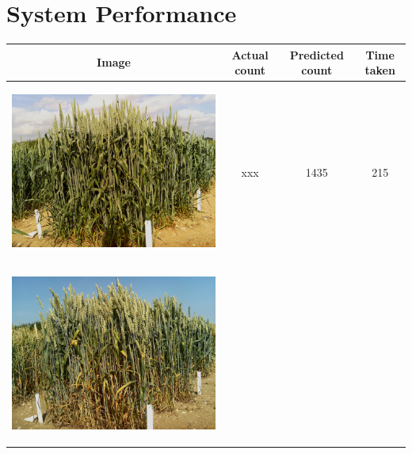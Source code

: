 \section{System Performance}
\begin{table}[hp!]
  \centering
  \begin{tabular}{ | c | c | c | c |}
    \hline
    Image & Actual count & Predicted count & Time taken \\ \hline
    \begin{minipage}{.3\textwidth}
      \begin{center}
		\includegraphics[width=\linewidth]{Images/001}
      \end{center}
    \end{minipage}
    &
      xxx
    & 
      1435
    & 
      215
    \\ \hline
    \begin{minipage}{.3\textwidth}
      \begin{center}
		\includegraphics[width=\linewidth]{Images/002}

\end{center}
\end{minipage}
\end{tabular}
\end{table}
